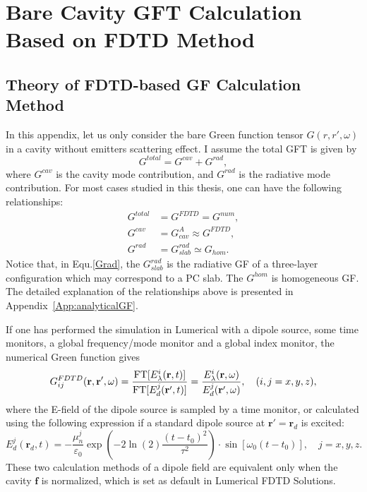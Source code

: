 \chapter[Numerical Bare Cavity GFT Calculation]{Bare Cavity GFT Calculation Based on FDTD Method}\label{App:FDTD_GFT}
\section{Theory of FDTD-based GF Calculation Method}\label{section:schema4bareGFT}

In this appendix, let us only consider the bare Green function tensor $G(r,r',\omega)$ in a cavity without emitters scattering effect. I assume the total GFT is given by
\begin{equation}
 G^{total}=G^{cav}+G^{rad},
\label{Gtotal}
\end{equation}
where $G^{cav}$ is the cavity mode contribution, and $G^{rad}$ is the radiative mode contribution. For most cases studied in this thesis, one can have the following relationships:
\begin{subequations}
 \begin{align}
 \label{Gtotalnum} G^{total} &=G^{FDTD}=G^{num}, \\
 \label{Gcav} G^{cav} &=G^{A}_{cav}\approx G^{FDTD}, \\
 \label{Grad} G^{rad} &=G^{rad}_{slab} \simeq G_{hom}.
 \end{align}
\end{subequations}
Notice that, in Equ.\eqref{Grad}, the $G^{rad}_{slab}$ is the radiative GF of a three-layer configuration which may correspond to a PC slab. The $G^{hom}$ is homogeneous GF.
The detailed explanation of the relationships above is presented in Appendix~\ref{App:analyticalGF}.

If one has performed the simulation in Lumerical with a dipole source, some time monitors, a global frequency/mode monitor and a global index monitor, the numerical Green function gives
\begin{equation}
 G_{ij}^{FDTD}(\mathbf{r},\mathbf{r}',\omega)=\frac{{\rm FT}[E^i_\lambda(\mathbf{r},t)]}{{\rm FT}[E^j_d(\mathbf{r}',t)]}
=\frac{E^i_\lambda(\mathbf{r},\omega)}{E^j_d(\mathbf{r}',\omega)}, \quad (i,j=x, y, z),
\label{Gnum}
\end{equation}
where the E-field of the dipole source is sampled by a time monitor, or calculated using the following expression if a standard dipole source at $\mathbf{r}'=\mathbf{r}_d$ is excited:
\begin{equation}
 \label{def:dipleft}
E^j_d(\mathbf{r}_d,t)=-\frac{\mu_n^j}{\varepsilon_0}\exp(-2\ln(2)\frac{(t-t_0)^2}{\tau^2})\cdot\sin[\omega_0(t-t_0)],\quad j=x, y, z.
\end{equation}
These two calculation methods of a dipole field are equivalent only when the cavity $\mathbf{f}$ is normalized, which is set as default in Lumerical FDTD Solutions.

